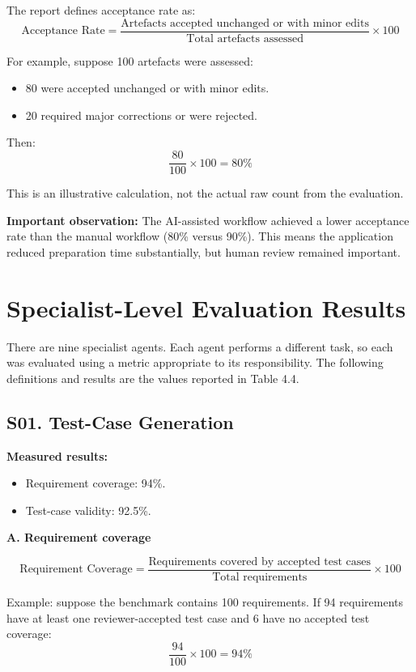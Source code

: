 \documentclass[11pt,a4paper]{article}
\begin{document}
The report defines acceptance rate as:
\[
\text{Acceptance Rate} =
\frac{\text{Artefacts accepted unchanged or with minor edits}}
     {\text{Total artefacts assessed}}\times 100
\]

For example, suppose 100 artefacts were assessed:
\begin{itemize}
  \item 80 were accepted unchanged or with minor edits.
  \item 20 required major corrections or were rejected.
\end{itemize}
Then:
\[
\frac{80}{100}\times 100=80\%
\]

This is an illustrative calculation, not the actual raw count from the evaluation.

\textbf{Important observation:} The AI-assisted workflow achieved a lower acceptance rate than the manual workflow (80\% versus 90\%). This means the application reduced preparation time substantially, but human review remained important.

\section{Specialist-Level Evaluation Results}

There are nine specialist agents. Each agent performs a different task, so each was evaluated using a metric appropriate to its responsibility. The following definitions and results are the values reported in Table 4.4.

\subsection{S01. Test-Case Generation}

\textbf{Measured results:}
\begin{itemize}
  \item Requirement coverage: 94\%.
  \item Test-case validity: 92.5\%.
\end{itemize}

\textbf{A. Requirement coverage}

\[
\text{Requirement Coverage} =
\frac{\text{Requirements covered by accepted test cases}}
     {\text{Total requirements}}\times 100
\]

Example: suppose the benchmark contains 100 requirements. If 94 requirements have at least one reviewer-accepted test case and 6 have no accepted test coverage:
\[
\frac{94}{100}\times 100=94\%
\]
\end{document}
